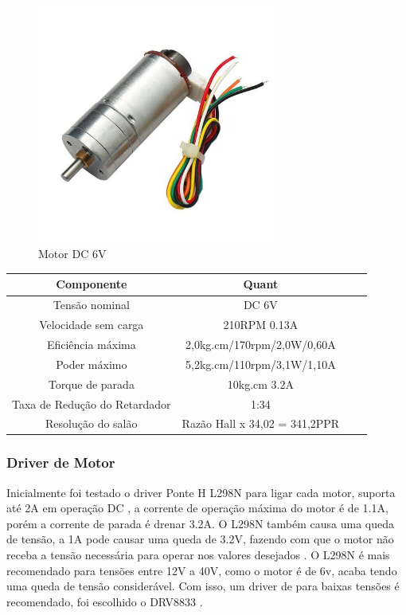 \begin{figure}[htb]
	\centering
	\includegraphics[width=0.7\textwidth]{figures/CHR_GM25_370}
	\caption{Motor DC 6V \cite{motor_dc_6v_encoder}}
\end{figure}

\begin{quadro}[htb]
	\caption{\label{Especificacoes_motordc_6v}Especificações do motor DC 6V}
	 \begin{tabular}{|c|c|c|c|}
		\hline
		\textbf{Componente} & \textbf{Quant} \\ \hline
		Tensão nominal & DC 6V  \\ \hline
		Velocidade sem carga  & 210RPM 0.13A  \\ \hline
		Eficiência máxima & 2,0kg.cm/170rpm/2,0W/0,60A   \\ \hline
		Poder máximo & 5,2kg.cm/110rpm/3,1W/1,10A   \\ \hline
		Torque de parada  & 10kg.cm 3.2A    \\ \hline
		Taxa de Redução do Retardador & 1:34  \\ \hline
		Resolução do salão & Razão Hall x 34,02 = 341,2PPR  \\ \hline
	\end{tabular}
\end{quadro}


\subsubsection{Driver de Motor}
Inicialmente foi testado o driver Ponte H L298N para ligar cada motor, suporta até 2A em operação DC \cite{datasheel_l298n},
a corrente de operação máxima do motor é de 1.1A, porém a corrente de parada é drenar 3.2A. 
O L298N também causa uma queda de tensão, a 1A pode causar uma queda de 3.2V, fazendo com que o
motor não receba a tensão necessária para operar nos valores desejados \cite{datasheel_l298n}. 
O L298N é mais recomendado para tensões entre 12V a 40V, como o motor é de 6v, acaba tendo uma queda de tensão considerável.
Com isso, um driver de para baixas tensões é recomendado, foi escolhido o DRV8833 \cite{datasheel_dvr8833}.


